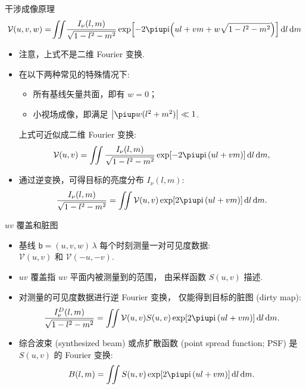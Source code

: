 \documentclass{beamer}
\newcommand{\R}[1]{\text{#1}}  %
\newcommand{\Ci}{\R{i}}  %
\newcommand{\Cpi}{\piup}  %
\newcommand{\B}[1]{\bm{\mathsf{#1}}}  %
\newcommand{\D}[1]{\R{d}#1}
\begin{document}
\begin{frame}{干涉成像原理}
  \begin{equation}
    \mathcal{V}(u,v,w)
      = \!\iint \!\frac{I_{\nu}(l,m)}{\sqrt{1-l^2-m^2}}
      \exp \!\left[ -2\Cpi\Ci \!\left( ul+vm+w\sqrt{1-l^2-m^2} \right) \right]
      \D{l}\,\D{m}
  \end{equation}

  \begin{itemize}
    \item 注意，上式\alert{不是}二维 Fourier 变换.
    \item 在以下两种常见的特殊情况下:
      \begin{itemize}
        \item 所有基线矢量共面，即有 $w = 0$；
        \item 小视场成像，即满足 $\big| \Cpi w(l^2+m^2) \big| \ll 1$.
      \end{itemize}
      上式可近似成二维 Fourier 变换:
      \begin{equation}
        \mathcal{V}(u,v)
          = \iint \frac{I_{\nu}(l,m)}{\sqrt{1-l^2-m^2}}
            \exp [-2\Cpi\Ci\, (ul+vm)] \,\D{l}\,\D{m},
      \end{equation}
    \item 通过逆变换，可得目标的亮度分布 $I_{\nu}(l,m)$:
      \begin{equation}
        \frac{I_{\nu}(l,m)}{\sqrt{1-l^2-m^2}}
          = \iint \mathcal{V}(u,v)
            \exp [2\Cpi\Ci\, (ul+vm)] \,\D{l}\,\D{m}.
      \end{equation}
  \end{itemize}
\end{frame}

\begin{frame}{$uv$ 覆盖和脏图}
  \begin{itemize}
    \item 基线 $\B{b} = (u,v,w) \,\lambda$ 每个时刻测量一对可见度数据: \\
      $\mathcal{V}(u,v)$ 和 $\mathcal{V}(-u,-v)$.
    \item \alert{$uv$ 覆盖}指 $uv$ 平面内被测量到的范围，
      由\alert{采样函数} $S(u,v)$ 描述.
    \item 对测量的可见度数据进行逆 Fourier 变换，
      仅能得到目标的\alert{脏图 (dirty map)}:
      \begin{equation}
        \frac{I_{\nu}^D(l,m)}{\sqrt{1-l^2-m^2}}
          = \iint \mathcal{V}(u,v) S(u,v)
            \exp [2\Cpi\Ci\, (ul+vm)] \,\D{l}\,\D{m}.
      \end{equation}
    \item \alert{综合波束 (synthesized beam)}
      或\alert{点扩散函数 (point spread function; PSF)}
      是 $S(u,v)$ 的 Fourier 变换:
      \begin{equation}
        B(l,m) = \iint S(u,v) \exp [2\Cpi\Ci\, (ul+vm)] \,\D{l}\,\D{m}.
      \end{equation}
  \end{itemize}
\end{frame}
\end{document}
